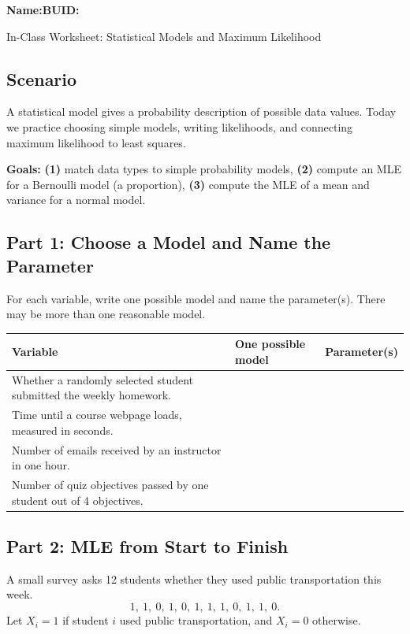 \documentclass{article}
\newcommand{\blankline}[1]{\underline{\hspace{#1}}}
\begin{document}
\noindent\textbf{Name:}\blankline{2.25in}\hfill\textbf{BUID:}\blankline{1.55in}\newline

\begin{center}
 \Large In-Class Worksheet: Statistical Models and Maximum Likelihood
\end{center}

\subsection*{Scenario}
A statistical model gives a probability description of possible data values. Today we practice choosing simple models, writing likelihoods, and connecting maximum likelihood to least squares.

\medskip
\noindent\textbf{Goals:} \textbf{(1)} match data types to simple probability models, \textbf{(2)} compute an MLE for a Bernoulli model (a proportion), \textbf{(3)} compute the MLE of a mean and variance for a normal model.

\subsection*{Part 1: Choose a Model and Name the Parameter}
For each variable, write one possible model and name the parameter(s). There may be more than one reasonable model.

\begin{center}
\renewcommand{\arraystretch}{1.55}
\begin{tabularx}{\textwidth}{p{6.7cm}p{4.2cm}X}
\toprule
\textbf{Variable} & \textbf{One possible model} & \textbf{Parameter(s)} \\
\midrule
Whether a randomly selected student submitted the weekly homework. & & \\[2.1em]
Time until a course webpage loads, measured in seconds. & & \\[2.1em]
Number of emails received by an instructor in one hour. & & \\[2.1em]
Number of quiz objectives passed by one student out of 4 objectives. & & \\
\bottomrule
\end{tabularx}
\end{center}

\subsection*{Part 2: MLE from Start to Finish}
A small survey asks 12 students whether they used public transportation this week.
\[
1,\ 1,\ 0,\ 1,\ 0,\ 1,\ 1,\ 1,\ 0,\ 1,\ 1,\ 0.
\]
Let $X_i = 1$ if student $i$ used public transportation, and $X_i=0$ otherwise.
\end{document}
